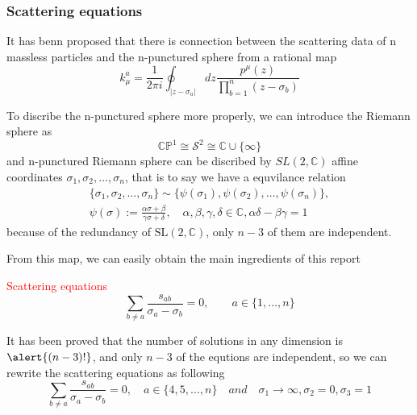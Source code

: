 \documentclass{beamer}
\begin{document}
\begin{frame}
    \frametitle{Scattering equations}
    It has benn proposed that there is connection between the scattering data of n massless particles and the n-punctured sphere from a rational map
    \begin{equation*}
        k_\mu^a=\frac{1}{2\pi i}\oint_{|z-\sigma_a|}dz\frac{p^\mu(z)}{\prod ^n_{b=1}(z-\sigma_b)}
    \end{equation*}
 
    To discribe the n-punctured sphere more properly, we can introduce the Riemann sphere as
    \begin{equation*}
        \mathbb{CP}^1\cong \mathcal{S}^2\cong \mathbb{C}\cup\{\infty\}
    \end{equation*}
    and n-punctured Riemann sphere can be discribed by $SL(2,\mathbb{C})$ affine coordinates ${\sigma_1,\sigma_2,\ldots,\sigma_n}$, that is to say we have a equvilance relation
    \begin{align*}
        \{\sigma_1,\sigma_2,\ldots,\sigma_n\}\sim\{\psi(\sigma_1),\psi(\sigma_2),\ldots,\psi(\sigma_n)\},\\\psi(\sigma):=\frac{\alpha\sigma+\beta}{\gamma\sigma+\delta},\quad\alpha,\beta,\gamma,\delta\in\mathbb{C},\alpha\delta-\beta\gamma=1
    \end{align*}
    because of the redundancy of $\mathrm{SL}(2,\mathbb{C})$, only $n-3$ of them are independent.
\end{frame}
\begin{frame}
    From this map, we can easily obtain the main ingredients of this report \\
    

    \begin{block}{\textcolor{red}{Scattering equations}}
        \begin{equation*}
            \sum_{b\neq a } \frac{s_{ab}}{\sigma_a-\sigma_{b}}=0,\qquad a\in \{1,\dots,n\}
        \end{equation*}
    \end{block}
    It has been proved that the number of solutions in any dimension is $\alert{(n-3)!}$, and only \alert{$n-3$} of the equtions are independent, so we can rewrite the scattering equations as following 
    \begin{equation*}
        \sum_{b\neq a } \frac{s_{ab}}{\sigma_a-\sigma_{b}}=0,\quad a\in \{4,5,\dots,n\}\quad and\quad  \sigma_1\rightarrow\infty,\sigma_2=0,\sigma_3=1
    \end{equation*}
\end{frame}
\iffalse
\end{document}
